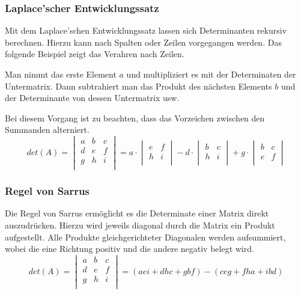 \subsubsection{Laplace'scher Entwicklungssatz}
Mit dem Laplace'schen Entwicklungssatz lassen sich Determinanten
rekursiv berechnen. Hierzu kann nach Spalten oder Zeilen vorgegangen
werden. Das folgende Beispiel zeigt das Verahren nach Zeilen. 

Man nimmt das erste Element $a$ und multipliziert es mit der Determinaten
der Untermatrix. Dann subtrahiert man das Produkt des nächsten Elements 
$b$ und der Determinante von dessen Untermatrix usw. 

Bei diesem Vorgang ist zu beachten, dass das Vorzeichen zwischen den
Summanden alterniert. 
\[  
    det(A)
        =   \begin{vmatrix}
                a & b & c \\
                d & e & f \\
                g & h & i \\
            \end{vmatrix}
        = a \cdot 
            \begin{vmatrix} 
                e & f \\
                h & i \\
            \end{vmatrix}
            - 
            d \cdot 
            \begin{vmatrix}
                b & c \\
                h & i \\
            \end{vmatrix}
            + 
            g \cdot 
            \begin{vmatrix}
                b & c \\
                e & f \\
            \end{vmatrix} 
\]

\subsubsection{Regel von Sarrus}
Die Regel von Sarrus ermöglicht es die Determinate einer Matrix direkt
auszudrücken. Hierzu wird jeweils diagonal durch die Matrix ein Produkt
aufgestellt. Alle Produkte gleichgerichteter Diagonalen werden 
aufsummiert, wobei die eine Richtung positiv und die andere negativ
belegt wird.
\[  
    det(A)
        =   \begin{vmatrix}
                a & b & c \\
                d & e & f \\
                g & h & i \\
            \end{vmatrix}
        = (aei + dhc + gbf) - (ceg + fha + ibd)
\]

